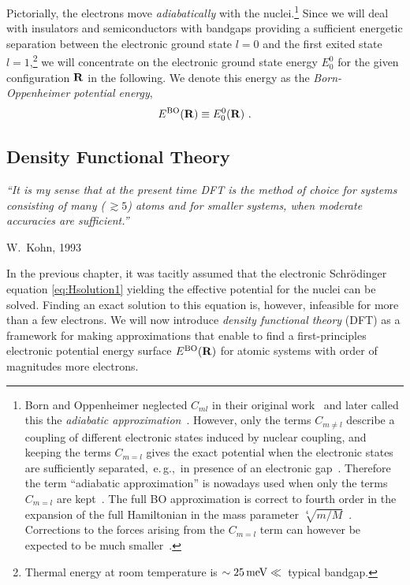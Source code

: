 Pictorially, the electrons move \emph{adiabatically} with the nuclei.\footnote{Born and Oppenheimer neglected $C_{ml}$ in their original work~\cite{BornOppenheimer} and later called this the \emph{adiabatic approximation}~\cite{BornHuang}. However, only the terms $C_{m \neq l}$ describe a coupling of different electronic states induced by nuclear coupling, and keeping the terms $C_{m=l}$ gives the exact potential when the electronic states are sufficiently separated,~e.\,g.,~in presence of an electronic gap~\cite{BornHuang}. Therefore the term ``adiabatic approximation'' is nowadays used when only the terms $C_{m=l}$ are kept~\cite{Marx2009}. The full BO approximation is correct to fourth order in the expansion of the full Hamiltonian in the mass parameter $\sqrt[4]{m/M}$~\cite{BornHuang}. Corrections to the forces arising from the $C_{m=l}$ term can however be expected to be much smaller~\cite{Ziman1955}.} Since we will deal with insulators and semiconductors with bandgaps providing a sufficient energetic separation between the electronic ground state $l=0$ and the first exited state $l=1$,\footnote{Thermal energy at room temperature is $\sim 25\,{\rm meV} \ll $~typical bandgap.} we will concentrate on the electronic ground state energy $E^0_0$ for the given configuration ${\bf R}$ in the following. We denote this energy as the \emph{Born-Oppenheimer potential energy},
\begin{align}
	E^{\rm BO} ({\bf R}) \equiv E^0_0 ({\bf R})~.
	\label{eq:E^BO}
\end{align}

\newpage
\subsection{Density Functional Theory}
\epigraph{\singlespacing \it ``It is my sense that at the present time DFT is the method of choice for systems consisting of many (\,$\gtrsim 5$) atoms and for smaller systems, when moderate accuracies are sufficient.''}{W.~Kohn, 1993}

In the previous chapter, it was tacitly assumed that the electronic Schr\"odinger equation \eqref{eq:Hsolution1} yielding the effective potential for the nuclei can be solved. Finding an exact solution to this equation is, however, infeasible for more than a few electrons. We will now introduce \emph{density functional theory} (DFT) as a framework for making approximations that enable to find a first-principles electronic potential energy surface $E^{\rm BO} ({\bf R})$ for atomic systems with order of magnitudes more electrons.

